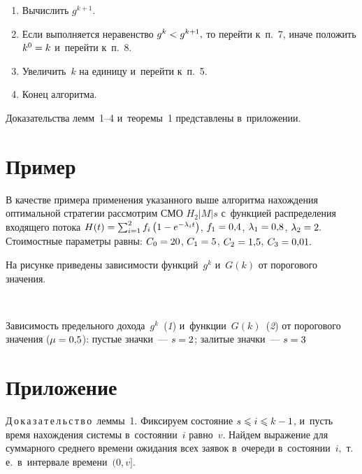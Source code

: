 \begin{multicols}{2}
\begin{enumerate}[1.]
\item Вычислить $g^{k+1}.$

\item Если выполняется неравенство $g^k\hm<g^{k+1},$ то перейти к~п.~7, 
иначе положить $k^0\hm=k$ и~пе\-рейти к~п.~8.

\item Увеличить~$k$ на единицу и~перейти к~п.~5.

\item Конец алгоритма.
\end{enumerate}

Доказательства лемм~1--4 и~тео\-ре\-мы~1 пред\-став\-ле\-ны в~приложении.

\section{Пример}

В качестве примера применения указанного выше алгоритма нахождения
оптимальной стратегии рассмотрим СМО $H_2|M|s$ с~функцией
распределения входящего потока
$H(t)\hm=\sum\nolimits_{i=1}^2 f_i\left(1-e^{-\lambda_it}\right)$,
$f_1\hm=0{,}4$, $\lambda_1\hm=0{,}8$, $\lambda_2\hm=2.$ Стоимостные параметры
равны: $C_0\hm=20$, $C_1\hm=5$, $C_2\hm=1{,}5$, $C_3\hm=0{,}01.$

На рисунке приведены зависимости функций~$g^k$ и~$G(k)$ от
порогового значения. 


{ \begin{center}  %
 \vspace*{6pt}
 \mbox{%
 \epsfxsize=79.0mm 
 }


\end{center}

\vspace*{-1pt}


\noindent
{\small{Зависимость предельного дохода~$g^k$~(\textit{1}) и~функции~$G(k)$~(\textit{2}) от
порогового значения ($\mu\hm=0{,}5$): пустые значки~--- $s\hm=2$;
залитые значки~--- $s\hm=3$}}
}

\vspace*{6pt}



{\small \section*{\raggedleft Приложение}

\noindent
Д\,о\,к\,а\,з\,а\,т\,е\,л\,ь\,с\,т\,в\,о\ леммы~1. 
Фиксируем состояние $s\hm\leqslant i\hm\leqslant
k\hm-1$, и~пусть время нахождения системы в~состоянии~$i$ равно~$v.$
Найдем выражение для суммарного среднего времени ожидания всех
заявок в~очереди в~состоянии~$i,$ т.\,е.\ в~интервале времени~$(0,v].$

}
\end{multicols}
